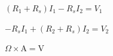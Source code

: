 \documentclass[border=12pt]{standalone}
\begin{document}
\color{weeknavy}
\parbox{11cm}{\centering $\displaystyle (R_1+R_s)I_1-R_sI_2=V_1$}
\vspace{4pt}
\parbox{11cm}{\centering $\displaystyle -R_sI_1+(R_2+R_s)I_2=V_2$}
\vspace{4pt}
\parbox{11cm}{\centering $\displaystyle \Omega\times\mathrm{A}=\mathrm{V}$}
\end{document}
